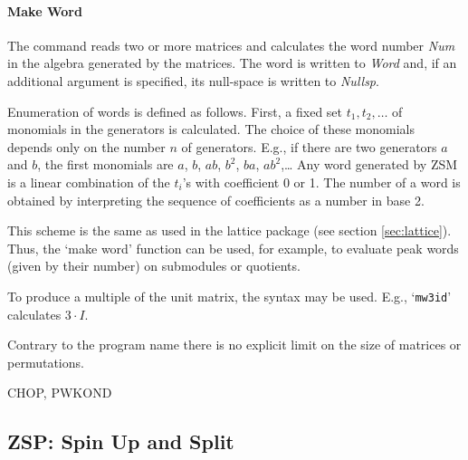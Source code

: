 \paragraph{Make Word}
The command
reads two or more matrices and calculates the word number {\it Num} in
the algebra generated by the matrices. The word is written to
{\it Word} and, if an additional argument is specified,
its null-space is written to {\it Nullsp}.

Enumeration of words is defined as follows.
First, a fixed set $t_1,t_2,\ldots$ of monomials in the generators
is calculated. The choice of these monomials depends only on the number
$n$ of generators. E.g., if there are two generators $a$ and $b$, the
first monomials are $a$, $b$, $ab$, $b^2$, $ba$, $ab^2$,\ldots{}
Any word generated by ZSM is a linear combination of the $t_i$'s
with coefficient 0 or 1. The number of a word is obtained by
interpreting the sequence of coefficients as a number in base 2.

This scheme is the same as used in the lattice package
(see section \ref{sec:lattice}). Thus, the `make word' function
can be used, for example, to evaluate peak words (given by their number)
on submodules or quotients.

To produce a multiple of the unit matrix, the syntax
\msg{zsm mw{\it Num}id {\it Gen1} {\it Gen2} {\it Word}]}
may be used. E.g., `\verb"mw3id"' calculates $3\cdot I$.

\Limits
Contrary to the program name there is no explicit limit on the
size of matrices or permutations.


\SeeAlso
CHOP, PWKOND


\subsection{ZSP: Spin Up and Split}
\Syntax
{}


